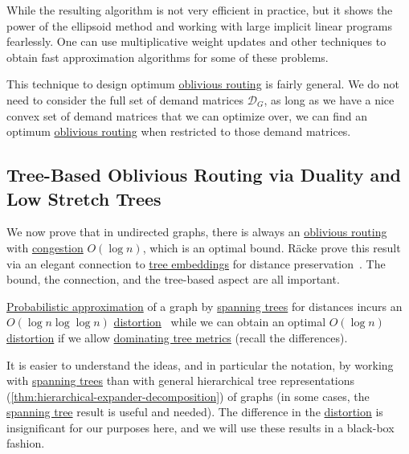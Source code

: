 While the resulting algorithm is not very efficient in practice, but it shows the power of the ellipsoid method and working with large implicit linear programs fearlessly. One can use multiplicative weight updates and other techniques to obtain fast approximation algorithms for some of these problems.

\begin{remark}
	This technique to design optimum \hyperref[def:edge-based-oblivious-routing]{oblivious routing} is fairly general. We do not need to consider the full set of demand matrices \(\mathcal{D} _G\), as long as we have a nice convex set of demand matrices that we can optimize over, we can find an optimum \hyperref[def:edge-based-oblivious-routing]{oblivious routing} when restricted to those demand matrices.
\end{remark}

\subsection{Tree-Based Oblivious Routing via Duality and Low Stretch Trees}
We now prove that in undirected graphs, there is always an \hyperref[def:edge-based-oblivious-routing]{oblivious routing} with \hyperref[def:congestion-of-oblivious-routing]{congestion} \(O(\log n)\), which is an optimal bound. Räcke prove this result via an elegant connection to \hyperref[prb:tree-embedding]{tree embeddings} for distance preservation~\cite{racke2008optimal}. The bound, the connection, and the tree-based aspect are all important.

\begin{prev}
	\hyperref[def:probabilistic-approximation]{Probabilistic approximation} of a graph by \hyperref[def:spanning-tree]{spanning trees} for distances incurs an \(O(\log n \log \log n)\) \hyperref[def:distortion]{distortion}~\cite{abraham2008nearly} while we can obtain an optimal \(O(\log n)\) \hyperref[def:distortion]{distortion} if we allow \hyperref[def:dominating-tree-metric]{dominating tree metrics} (recall the differences).
\end{prev}

It is easier to understand the ideas, and in particular the notation, by working with \hyperref[def:spanning-tree]{spanning trees} than with general hierarchical tree representations (\autoref{thm:hierarchical-expander-decomposition}) of graphs (in some cases, the \hyperref[def:spanning-tree]{spanning tree} result is useful and needed). The difference in the \hyperref[def:distortion]{distortion} is insignificant for our purposes here, and we will use these results in a black-box fashion.

